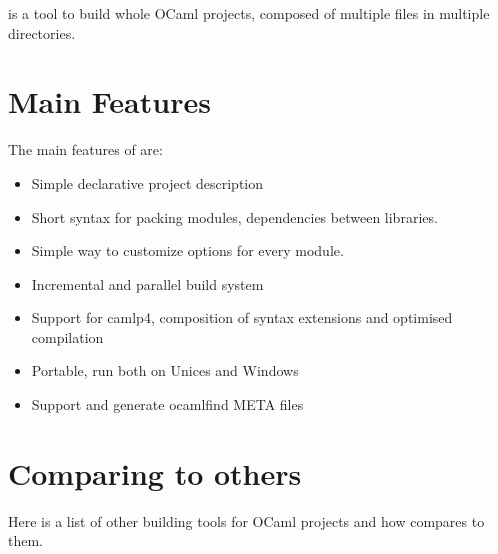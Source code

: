 
\ocpbuild{} is a tool to build whole OCaml projects, composed of
multiple files in multiple directories. 

\section{Main Features}

The main features of \ocpbuild{} are:

\begin{itemize}
\item Simple declarative project description
\item Short syntax for packing modules, 
  dependencies between libraries.
\item Simple way to customize options for every module.
\item Incremental and parallel build system
\item Support for camlp4, composition of syntax extensions and
  optimised compilation
\item Portable, run both on Unices and Windows
\item Support and generate ocamlfind META files
\end{itemize}

\section{Comparing \ocpbuild{} to others}

Here is a list of other building tools for OCaml projects and how
\ocpbuild{} compares to them.

